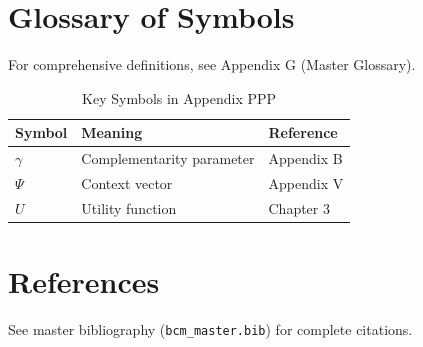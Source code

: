 \section{Glossary of Symbols}
\label{sec:ppp-glossary}

For comprehensive definitions, see Appendix G (Master Glossary).

\begin{table}[htbp]
\centering
\caption{Key Symbols in Appendix PPP}
\begin{tabular}{lll}
\toprule
\textbf{Symbol} & \textbf{Meaning} & \textbf{Reference} \\
\midrule
$\gamma$ & Complementarity parameter & Appendix B \\
$\Psi$ & Context vector & Appendix V \\
$U$ & Utility function & Chapter 3 \\
\bottomrule
\end{tabular}
\end{table}


\section{References}
\label{sec:references}

See master bibliography (\texttt{bcm\_master.bib}) for complete citations.

\nocite{bcm_master}


